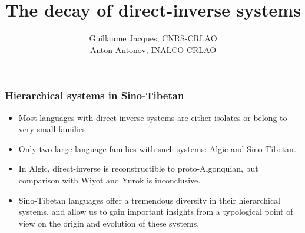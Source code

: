 \documentclass[xcolor=table]{beamer}
\begin{document}
\begin{frame} 
 \title{The decay of direct-inverse systems}
 \author{Guillaume Jacques, CNRS-CRLAO \\ Anton Antonov, INALCO-CRLAO}
 \maketitle
 \end{frame} 


\begin{frame}
 \frametitle{Hierarchical systems in Sino-Tibetan}
 
 \begin{itemize}[<+->]
\item Most languages with direct-inverse systems are either isolates or belong to very small families.
\item Only two large language families with such systems: Algic and Sino-Tibetan.
\item In Algic, direct-inverse is reconstructible to proto-Algonquian, but comparison with Wiyot and Yurok is inconclusive.
\item Sino-Tibetan languages  offer a tremendous diversity in their hierarchical systems, and allow us to gain important insights from a typological point of view on the origin and evolution of these systems.


\end{itemize}
 \end{frame}  
 
 
 
\end{document}
